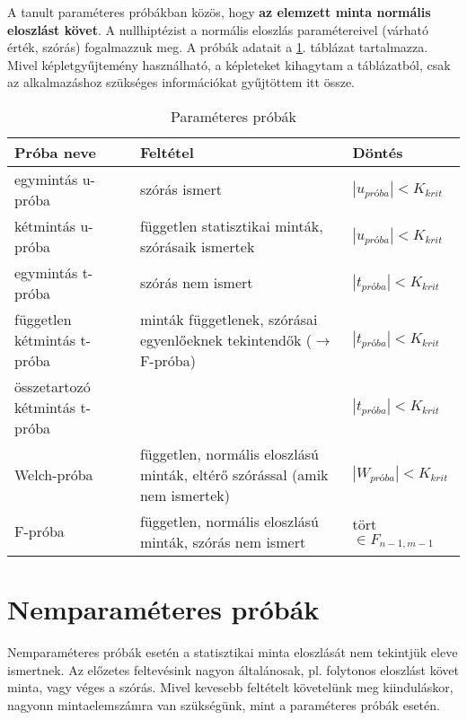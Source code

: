 A tanult paraméteres próbákban közös, hogy \textbf{az elemzett minta normális eloszlást követ}. A nullhiptézist a normális eloszlás paramétereivel (várható érték, szórás) fogalmazzuk meg. A próbák adatait a \ref{tab:param}. táblázat tartalmazza. Mivel képletgyűjtemény használható, a képleteket kihagytam a táblázatból, csak az alkalmazáshoz szükséges információkat gyűjtöttem itt össze.

\begin{table}[h]
\centering
\caption{Paraméteres próbák}
\label{tab:param}
\begin{tabular}{|p{}|p{5cm}|p{3cm}|}
\hline
\textbf{Próba neve}            & \textbf{Feltétel}                                                             & Döntés                   \\ \hline
egymintás u-próba              & szórás ismert                                                                 & $|u_{próba}| < K_{krit}$ \\ \hline
kétmintás u-próba              & független statisztikai minták, szórásaik ismertek                             & $|u_{próba}| < K_{krit}$ \\ \hline
egymintás t-próba              & szórás nem ismert                                                             & $|t_{próba}| < K_{krit}$ \\ \hline
független kétmintás t-próba    & minták függetlenek, szórásai egyenlőeknek tekintendők ($\rightarrow$ F-próba) & $|t_{próba}| < K_{krit}$ \\ \hline
összetartozó kétmintás t-próba &                                                                               & $|t_{próba}| < K_{krit}$ \\ \hline
Welch-próba                    & független, normális eloszlású minták, eltérő szórással (amik nem ismertek)    & $|W_{próba}| < K_{krit}$ \\ \hline
F-próba                        & független, normális eloszlású minták, szórás nem ismert                       & tört $\in F_{n-1,m-1}$   \\ \hline
\end{tabular}
\end{table}

\section{Nemparaméteres próbák}

Nemparaméteres próbák esetén a statisztikai minta eloszlását nem tekintjük eleve ismertnek. Az előzetes feltevésink nagyon általánosak, pl. folytonos eloszlást követ minta, vagy véges a szórás. Mivel kevesebb feltételt követelünk meg kiinduláskor, nagyonn mintaelemszámra van szükségünk, mint a paraméteres próbák esetén.

